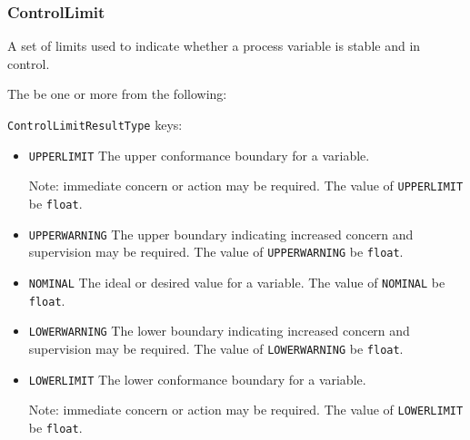 \subsubsection{ControlLimit}
\label{sec:ControlLimit}



A set of limits used to indicate whether a process variable is stable and in control.


The   \MUST be one or more from the following:

\texttt{ControlLimitResultType} keys:

\begin{itemize}
\item \texttt{UPPER\textunderscore LIMIT} \newline The upper conformance boundary for a variable.

\newline Note: immediate concern or action may be required. 
\newline The value of \texttt{UPPER\textunderscore LIMIT} \MUST be \texttt{float}.

\item \texttt{UPPER\textunderscore WARNING} \newline The upper boundary indicating increased concern and supervision may be required. 
\newline The value of \texttt{UPPER\textunderscore WARNING} \MUST be \texttt{float}.

\item \texttt{NOMINAL} \newline The ideal or desired value for a variable. 
\newline The value of \texttt{NOMINAL} \MUST be \texttt{float}.

\item \texttt{LOWER\textunderscore WARNING} \newline The lower boundary indicating increased concern and supervision may be required. 
\newline The value of \texttt{LOWER\textunderscore WARNING} \MUST be \texttt{float}.

\item \texttt{LOWER\textunderscore LIMIT} \newline The lower conformance boundary for a variable.

\newline Note: immediate concern or action may be required. 
\newline The value of \texttt{LOWER\textunderscore LIMIT} \MUST be \texttt{float}.

\end{itemize}



